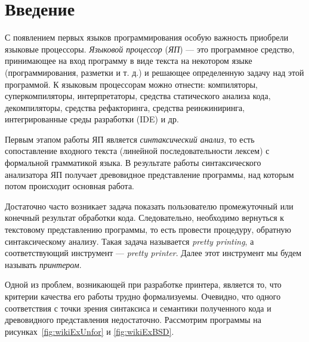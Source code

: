 \section*{Введение}


С появлением первых языков программирования особую важность приобрели языковые процессоры. \emph{Языковой процессор} (\emph{ЯП}) --- это программное средство, принимающее на вход программу в виде текста на некотором языке (программирования, разметки и т. д.) и решающее определенную задачу над этой программой. К языковым процессорам можно отнести: компиляторы, суперкомпиляторы, интерпретаторы, средства статического анализа кода, декомпиляторы, средства рефакторинга, средства реинжиниринга, интегрированные среды разработки (IDE) и др.

Первым этапом работы ЯП является \emph{синтаксический анализ}, то есть сопоставление входного текста (линейной последовательности лексем) с формальной грамматикой языка. В результате работы синтаксического анализатора ЯП получает древовидное представление программы, над которым потом происходит основная работа.

Достаточно часто возникает задача показать пользователю промежуточный или конечный результат обработки кода.
Следовательно, необходимо вернуться к текстовому представлению программы, то есть провести процедуру, обратную синтаксическому анализу. Такая задача называется \emph{pretty printing}, а соответствующий инструмент --- \emph{pretty printer}. Далее этот инструмент мы будем называть \emph{принтером}.

Одной из проблем, возникающей при разработке принтера, является то, что критерии качества его работы трудно формализуемы.
Очевидно, что одного соответствия с точки зрения синтаксиса и семантики полученного кода и древовидного представления недостаточно. Рассмотрим программы на рисунках~\ref{fig:wikiExUnfor} и \ref{fig:wikiExBSD}.

